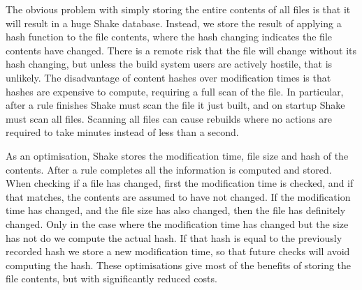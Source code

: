 The obvious problem with simply storing the entire contents of all files is that
it will result in a huge Shake database. Instead, we store the result of
applying a hash function to the file contents, where the hash changing indicates
the file contents have changed. There is a remote risk that the file will
change without its hash changing, but unless the build system users are actively
hostile, that is unlikely. The disadvantage of content hashes over modification
times is that hashes are expensive to compute, requiring a full scan of the
file. In particular, after a rule finishes Shake must scan the file it just
built, and on startup Shake must scan all files. Scanning all files can cause
rebuilds where no actions are required to take minutes instead of less than a
second.

As an optimisation, Shake stores the modification time, file size and hash of
the contents. After a rule completes all the information is computed and stored.
When checking if a file has changed, first the modification time is checked, and
if that matches, the contents are assumed to have not changed. If the
modification time has changed, and the file size has also changed, then the file
has definitely changed. Only in the case where the modification time has changed
but the size has not do we compute the actual hash. If that hash is equal to the
previously recorded hash we store a new modification time, so that future checks
will avoid computing the hash. These optimisations give most of the benefits of
storing the file contents, but with significantly reduced costs.

